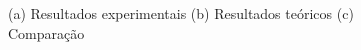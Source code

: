 \begin{figure}
    \centering
    \caption{(a) Resultados experimentais (b) Resultados teóricos (c) Comparação}
    \label{fig:foobar}
\end{figure}